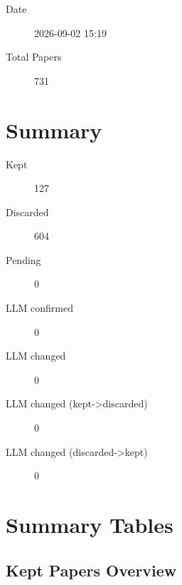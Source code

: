 \documentclass{article}
\begin{document}
\begin{description}
\item[Date] 2026-09-02 15:19
\item[Total Papers] 731
\end{description}

\section{Summary}
\begin{description}
\item[Kept] 127
\item[Discarded] 604
\item[Pending] 0
\item[LLM confirmed] 0
\item[LLM changed] 0
\item[LLM changed (kept->discarded)] 0
\item[LLM changed (discarded->kept)] 0
\end{description}

\section{Summary Tables}

\subsection{Kept Papers Overview}
\end{document}
